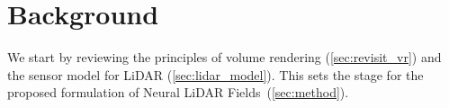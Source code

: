 

\section{Background}
We start by reviewing the principles of volume rendering (\cref{sec:revisit_vr}) and the sensor model for LiDAR (\cref{sec:lidar_model}). This sets the stage for the proposed formulation of Neural LiDAR Fields~(\cref{sec:method}).





